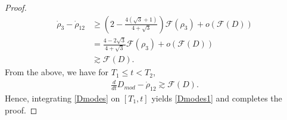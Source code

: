 \documentclass[10pt,a4paper]{amsart}
\begin{document}
\begin{proof}
\begin{align*}
\dot{\rho}_3-\dot{\rho}_{12}&\geq \left(2-\frac{4(\sqrt{3}+1)}{4+\sqrt{3}}\right)\mathcal{F}(\rho_3)+o\left(\mathcal{F}(D)\right)
\\
&=\frac{4-2\sqrt{3}}{4+\sqrt{3}}\mathcal{F}(\rho_3)+o\left(\mathcal{F}(D)\right)
\\
&\gtrsim \mathcal{F}(D).
\end{align*}
From the above, we have for $T_1\leq t<T_2$,
\begin{align}\label{Dmodes}
\frac{d}{dt}D_{mod}-\dot{\rho}_{12}\gtrsim \mathcal{F}(D).
\end{align}
Hence, integrating \eqref{Dmodes} on $[T_1,t]$ yields \eqref{Dmodes1} and completes the proof.
\end{proof}
\end{document}
